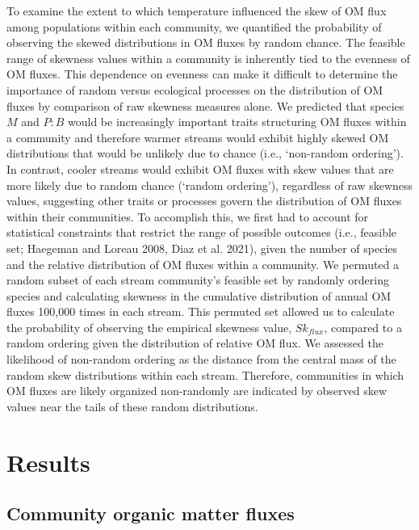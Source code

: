 \documentclass[
]{article}
\numberwithin{equation}
\begin{document}
To examine the extent to which temperature influenced the skew of OM
flux among populations within each community, we quantified the
probability of observing the skewed distributions in OM fluxes by random
chance. The feasible range of skewness values within a community is
inherently tied to the evenness of OM fluxes. This dependence on
evenness can make it difficult to determine the importance of random
versus ecological processes on the distribution of OM fluxes by
comparison of raw skewness measures alone. We predicted that species
\(M\) and \(P:B\) would be increasingly important traits structuring OM
fluxes within a community and therefore warmer streams would exhibit
highly skewed OM distributions that would be unlikely due to chance
(i.e., `non-random ordering'). In contrast, cooler streams would exhibit
OM fluxes with skew values that are more likely due to random chance
(`random ordering'), regardless of raw skewness values, suggesting other
traits or processes govern the distribution of OM fluxes within their
communities. To accomplish this, we first had to account for statistical
constraints that restrict the range of possible outcomes (i.e., feasible
set; Haegeman and Loreau 2008, Diaz et al. 2021), given the number of
species and the relative distribution of OM fluxes within a community.
We permuted a random subset of each stream community's feasible set by
randomly ordering species and calculating skewness in the cumulative
distribution of annual OM fluxes 100,000 times in each stream. This
permuted set allowed us to calculate the probability of observing the
empirical skewness value, \(Sk_{flux}\), compared to a random ordering
given the distribution of relative OM flux. We assessed the likelihood
of non-random ordering as the distance from the central mass of the
random skew distributions within each stream. Therefore, communities in
which OM fluxes are likely organized non-randomly are indicated by
observed skew values near the tails of these random distributions.

\hypertarget{results}{%
\section{Results}\label{results}}

\hypertarget{community-organic-matter-fluxes}{%
\subsection{Community organic matter
fluxes}\label{community-organic-matter-fluxes}}
\end{document}
